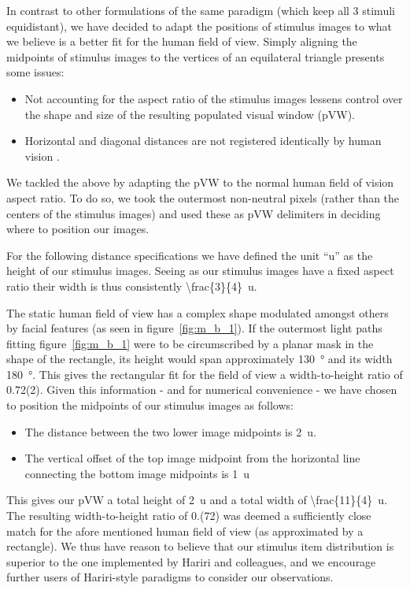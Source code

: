 	    In contrast to other formulations \citep{Hariri2000,Hariri2003} of the same paradigm (which keep all 3 stimuli equidistant),
	    we have decided to adapt the positions of stimulus images to what we believe is a better fit for the human field of view.
	    Simply aligning the midpoints of stimulus images to the vertices of an equilateral triangle presents some issues:
	    \begin{itemize}
		\item Not accounting for the aspect ratio of the stimulus images lessens control over the shape and size of the resulting populated visual window (pVW).
		\item Horizontal and diagonal distances are not registered identically by human vision \citep{TerryBahill1975}.
	    \end{itemize}
	    
	    We tackled the above by adapting the pVW to the normal human field of vision aspect ratio.
	    To do so, we took the outermost non-neutral pixels (rather than the centers of the stimulus images) and used these as pVW delimiters in deciding where to position our images.
	    
	    For the following distance specifications we have defined the unit “u” as the height of our stimulus images.
	    Seeing as our stimulus images have a fixed aspect ratio their width is thus consistently \SI[parse-numbers = false]{\frac{3}{4}}{u}.
	    
	    The static human field of view has a complex shape modulated amongst others by facial features (as seen in figure~\ref{fig:m_b_1}).
	    If the outermost light paths fitting figure~\ref{fig:m_b_1} were to be circumscribed by a planar mask in the shape of the rectangle, its height would span approximately \SI{130}{\degree} and its width \SI{180}{\degree}.
	    This gives the rectangular fit for the field of view a width-to-height ratio of 0.72(2).
	    Given this information - and for numerical convenience - we have chosen to position the midpoints of our stimulus images as follows:
	    \begin{itemize}
		\item The distance between the two lower image midpoints is \SI{2}{u}.
		\item The vertical offset of the top image midpoint from the horizontal line connecting the bottom image midpoints is \SI{1}{u}
	    \end{itemize}
	    This gives our pVW a total height of \SI{2}{u} and a total width of \SI[parse-numbers = false]{\frac{11}{4}}{u}.
	    The resulting width-to-height ratio of 0.(72) was deemed a sufficiently close match for the afore mentioned human field of view (as approximated by a rectangle).
	    We thus have reason to believe that our stimulus item distribution is superior to the one implemented by Hariri and colleagues, and we encourage further users of Hariri-style paradigms to consider our observations.  
	    
